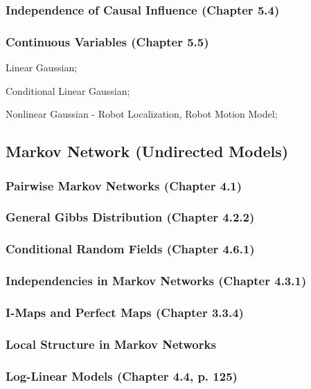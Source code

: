 \documentclass[12pt]{article}
\numberwithin{equation}{section}
\begin{document}
\subsubsection{Independence of Causal Influence (Chapter 5.4)}
\subsubsection{Continuous Variables (Chapter 5.5)}
Linear Gaussian;

Conditional Linear Gaussian;

Nonlinear Gaussian - Robot Localization, Robot Motion Model;

\subsection{Markov Network (Undirected Models)}
\subsubsection{Pairwise Markov Networks (Chapter 4.1)}









\subsubsection{General Gibbs Distribution (Chapter 4.2.2)}
\subsubsection{Conditional Random Fields (Chapter 4.6.1)}
\subsubsection{Independencies in Markov Networks (Chapter 4.3.1)}
\subsubsection{I-Maps and Perfect Maps (Chapter 3.3.4)}
\subsubsection{Local Structure in Markov Networks}
\subsubsection{Log-Linear Models (Chapter 4.4, p. 125)}
\end{document}

